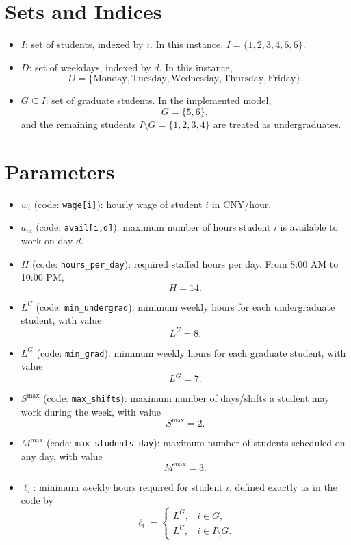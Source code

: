 \section*{Sets and Indices}

\begin{itemize}
    \item $I$: set of students, indexed by $i$. In this instance, $I=\{1,2,3,4,5,6\}$.
    \item $D$: set of weekdays, indexed by $d$. In this instance,
    \[
    D=\{\text{Monday},\text{Tuesday},\text{Wednesday},\text{Thursday},\text{Friday}\}.
    \]
    \item $G \subseteq I$: set of graduate students. In the implemented model,
    \[
    G=\{5,6\},
    \]
    and the remaining students $I\setminus G=\{1,2,3,4\}$ are treated as undergraduates.
\end{itemize}

\section*{Parameters}

\begin{itemize}
    \item $w_i$ (code: \texttt{wage[i]}): hourly wage of student $i$ in CNY/hour.
    \item $a_{id}$ (code: \texttt{avail[i,d]}): maximum number of hours student $i$ is available to work on day $d$.
    \item $H$ (code: \texttt{hours\_per\_day}): required staffed hours per day. From 8:00 AM to 10:00 PM,
    \[
    H=14.
    \]
    \item $L^{U}$ (code: \texttt{min\_undergrad}): minimum weekly hours for each undergraduate student, with value
    \[
    L^{U}=8.
    \]
    \item $L^{G}$ (code: \texttt{min\_grad}): minimum weekly hours for each graduate student, with value
    \[
    L^{G}=7.
    \]
    \item $S^{\max}$ (code: \texttt{max\_shifts}): maximum number of days/shifts a student may work during the week, with value
    \[
    S^{\max}=2.
    \]
    \item $M^{\max}$ (code: \texttt{max\_students\_day}): maximum number of students scheduled on any day, with value
    \[
    M^{\max}=3.
    \]
    \item $\ell_i$: minimum weekly hours required for student $i$, defined exactly as in the code by
    \[
    \ell_i=
    \begin{cases}
    L^{G}, & i \in G,\\
    L^{U}, & i \in I\setminus G.
    \end{cases}
    \]
\end{itemize}

